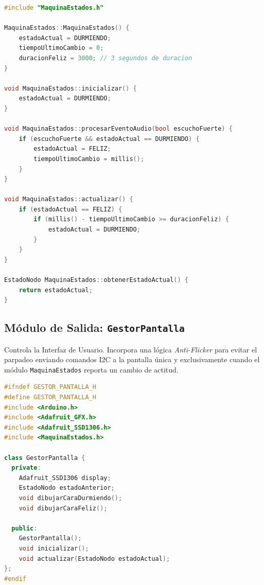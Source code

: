 \documentclass[10pt]{article}
\begin{document}
\begin{lstlisting}[language=C++, caption=lib/MaquinaEstados/MaquinaEstados.cpp]
#include "MaquinaEstados.h"

MaquinaEstados::MaquinaEstados() {
    estadoActual = DURMIENDO;
    tiempoUltimoCambio = 0;
    duracionFeliz = 3000; // 3 segundos de duracion
}

void MaquinaEstados::inicializar() {
    estadoActual = DURMIENDO;
}

void MaquinaEstados::procesarEventoAudio(bool escuchoFuerte) {
    if (escuchoFuerte && estadoActual == DURMIENDO) {
        estadoActual = FELIZ;
        tiempoUltimoCambio = millis();
    }
}

void MaquinaEstados::actualizar() {
    if (estadoActual == FELIZ) {
        if (millis() - tiempoUltimoCambio >= duracionFeliz) {
            estadoActual = DURMIENDO;
        }
    }
}

EstadoNodo MaquinaEstados::obtenerEstadoActual() {
    return estadoActual;
}
\end{lstlisting}

\subsection{Módulo de Salida: \texttt{GestorPantalla}}
Controla la Interfaz de Usuario. Incorpora una lógica \textit{Anti-Flicker} para evitar el parpadeo enviando comandos I2C a la pantalla única y exclusivamente cuando el módulo \texttt{MaquinaEstados} reporta un cambio de actitud.

\begin{lstlisting}[language=C++, caption=lib/GestorPantalla/GestorPantalla.h]
#ifndef GESTOR_PANTALLA_H
#define GESTOR_PANTALLA_H
#include <Arduino.h>
#include <Adafruit_GFX.h>
#include <Adafruit_SSD1306.h>
#include <MaquinaEstados.h>

class GestorPantalla {
  private:
    Adafruit_SSD1306 display;
    EstadoNodo estadoAnterior;
    void dibujarCaraDurmiendo();
    void dibujarCaraFeliz();

  public:
    GestorPantalla();
    void inicializar();
    void actualizar(EstadoNodo estadoActual);
};
#endif
\end{lstlisting}
\end{document}
